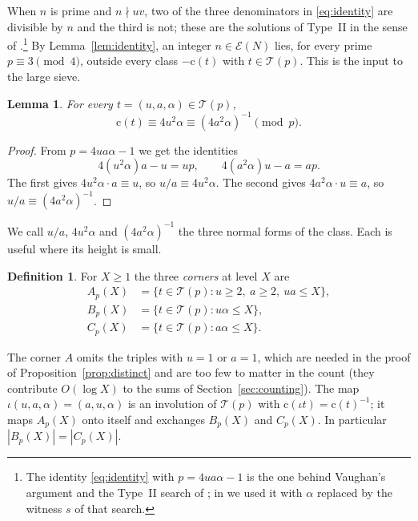 \documentclass[aps,prd,twocolumn,superscriptaddress,nofootinbib,longbibliography,floatfix,showkeys,nobalancelastpage,amsmath,amssymb,10pt]{revtex4-2}
\theoremstyle{plain}
\newtheorem{lemma}[theorem]{Lemma}
\theoremstyle{definition}
\newtheorem{definition}[theorem]{Definition}
\theoremstyle{plain}
\newcommand{\Ex}{\mathcal{E}}
\newcommand{\Tp}{\mathcal{T}}
\newcommand{\cl}{\mathrm{c}}
\begin{document}
When $n$ is prime and $n\nmid uv$, two of the three denominators in \eqref{eq:identity} are divisible by $n$ and the third is not; these are the solutions of Type~II in the sense of \cite{ET}.\footnote{The identity \eqref{eq:identity} with $p=4ua\alpha-1$ is the one behind Vaughan's argument \cite{Vau} and the Type~II search of \cite{Dah}; in \cite{BBv1} we used it with $\alpha$ replaced by the witness $s$ of that search.} By Lemma~\ref{lem:identity}, an integer $n\in\Ex(N)$ lies, for every prime $p\equiv3\pmod4$, outside every class $-\cl(t)$ with $t\in\Tp(p)$. This is the input to the large sieve.

\begin{lemma}\label{lem:forms}
For every $t=(u,a,\alpha)\in\Tp(p)$,
\begin{equation}\label{eq:forms}
\cl(t)\equiv4u^2\alpha\equiv(4a^2\alpha)^{-1}\pmod p.
\end{equation}
\end{lemma}

\begin{proof}
From $p=4ua\alpha-1$ we get the identities
\[
4(u^2\alpha)a-u=up,\qquad 4(a^2\alpha)u-a=ap.
\]
The first gives $4u^2\alpha\cdot a\equiv u$, so $u/a\equiv4u^2\alpha$. The second gives $4a^2\alpha\cdot u\equiv a$, so $u/a\equiv(4a^2\alpha)^{-1}$.
\end{proof}

We call $u/a$, $4u^2\alpha$ and $(4a^2\alpha)^{-1}$ the three normal forms of the class. Each is useful where its height is small.

\begin{definition}\label{def:corners}
For $X\ge1$ the three \emph{corners} at level $X$ are
\begin{align*}
A_p(X)&=\{t\in\Tp(p):u\ge2,\ a\ge2,\ ua\le X\},\\
B_p(X)&=\{t\in\Tp(p):u\alpha\le X\},\\
C_p(X)&=\{t\in\Tp(p):a\alpha\le X\}.
\end{align*}
\end{definition}

The corner $A$ omits the triples with $u=1$ or $a=1$, which are needed in the proof of Proposition~\ref{prop:distinct} and are too few to matter in the count (they contribute $O(\log X)$ to the sums of Section~\ref{sec:counting}). The map $\iota(u,a,\alpha)=(a,u,\alpha)$ is an involution of $\Tp(p)$ with $\cl(\iota t)=\cl(t)^{-1}$; it maps $A_p(X)$ onto itself and exchanges $B_p(X)$ and $C_p(X)$. In particular $|B_p(X)|=|C_p(X)|$.
\end{document}
